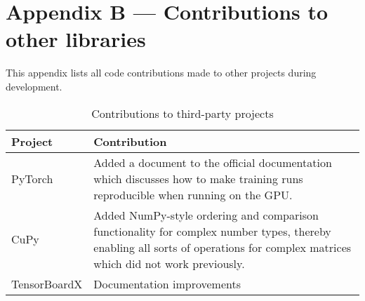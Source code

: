 \chapter{Appendix B --- Contributions to other libraries}\label{ch:appendixB}

This appendix lists all code contributions made to other projects during
development.

\begin{table}
    \centering
    \caption{Contributions to third-party projects}
    \label{tbl:pull}
    \begin{tabularx}{\textwidth}{lX}
        \toprule
        Project      & Contribution \tabularnewline
        \midrule
        PyTorch      & Added a document to the official documentation which discusses how to make training runs reproducible when running on the GPU. \tabularnewline
        CuPy         & Added NumPy-style ordering and comparison functionality for complex number types, thereby enabling all sorts of operations for complex matrices which did not work previously. \tabularnewline
        TensorBoardX & Documentation improvements
        \bottomrule
    \end{tabularx}
\end{table}

